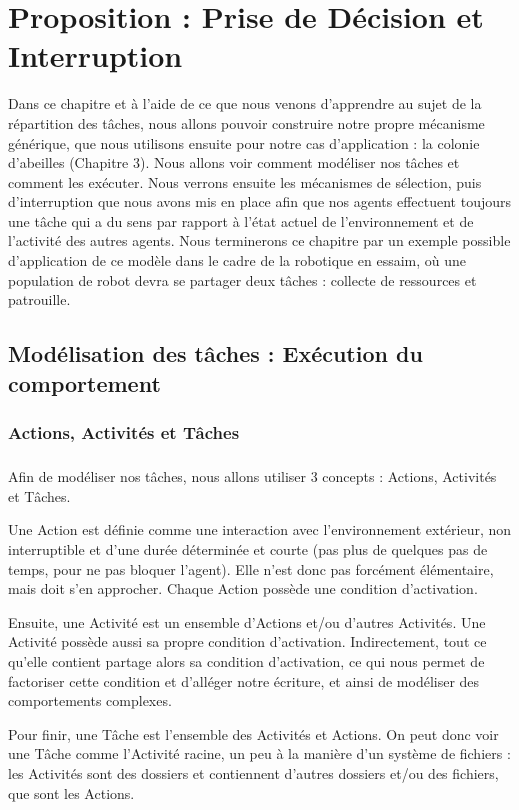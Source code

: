 \chapter{Proposition : Prise de Décision et Interruption}
	Dans ce chapitre et à l'aide de ce que nous venons d'apprendre au sujet de la répartition des tâches, nous allons pouvoir construire notre propre mécanisme générique, que nous utilisons ensuite pour notre cas d'application : la colonie d'abeilles (Chapitre 3). Nous allons voir comment modéliser nos tâches et comment les exécuter. Nous verrons ensuite les mécanismes de sélection, puis d'interruption que nous avons mis en place afin que nos agents effectuent toujours une tâche qui a du sens par rapport à l'état actuel de l'environnement et de l'activité des autres agents. Nous terminerons ce chapitre par un exemple possible d'application de ce modèle dans le cadre de la robotique en essaim, où une population de robot devra se partager deux tâches : collecte de ressources et patrouille.
	
	\section{Modélisation des tâches : Exécution du comportement}	
	
		\subsection{Actions, Activités et Tâches}
		\paragraph{}
			Afin de modéliser nos tâches, nous allons utiliser 3 concepts : Actions, Activités et Tâches.
			
			Une Action est définie comme une interaction avec l'environnement extérieur, non interruptible et d'une durée déterminée et courte (pas plus de quelques pas de temps, pour ne pas bloquer l'agent). Elle n'est donc pas forcément élémentaire, mais doit s'en approcher. Chaque Action possède une condition d'activation.
			
			Ensuite, une Activité est un ensemble d'Actions et/ou d'autres Activités. Une Activité possède aussi sa propre condition d'activation. Indirectement, tout ce qu'elle contient partage alors sa condition d'activation, ce qui nous permet de factoriser cette condition et d'alléger notre écriture, et ainsi de modéliser des comportements complexes.
			
			Pour finir, une Tâche est l'ensemble des Activités et Actions. On peut donc voir une Tâche comme l'Activité racine, un peu à la manière d'un système de fichiers : les Activités sont des dossiers et contiennent d'autres dossiers et/ou des fichiers, que sont les Actions.
			
